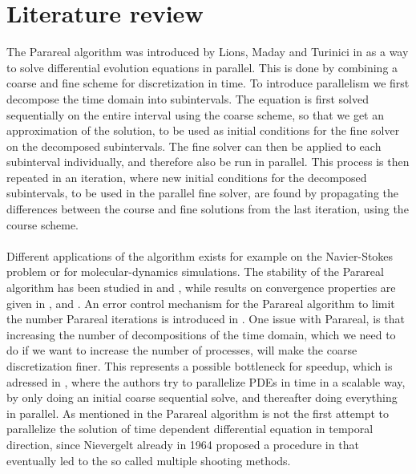 \chapter{Literature review}
The Parareal algorithm was introduced by Lions, Maday and Turinici in \cite{lions2001resolution} as a way to solve differential evolution equations in parallel. This is done by combining a coarse and fine scheme for discretization in time. To introduce parallelism we first decompose the time domain into subintervals. The equation is first solved sequentially on the entire interval using the coarse scheme, so that we get an approximation of the solution, to be used as initial conditions for the fine solver on the decomposed subintervals. The fine solver can then be applied to each subinterval individually, and therefore also be run in parallel. This process is then repeated in an iteration, where new initial conditions for the decomposed subintervals, to be used in the parallel fine solver, are found by propagating the differences between the course and fine solutions from the last iteration, using the course scheme. 
\\
\\
Different applications of the algorithm exists for example on the Navier-Stokes problem\cite{fischer2005parareal} or for molecular-dynamics simulations\cite{baffico2002parallel}. The stability of the Parareal algorithm has been studied in \cite{staff2005stability} and \cite{bal2005convergence}, while results on convergence properties are given in \cite{lions2001resolution},\cite{bal2005convergence} and \cite{gander2007superlinear}. An error control mechanism for the Parareal algorithm to limit the number Parareal iterations is introduced in \cite{lepsa2010efficient}. One issue with Parareal, is that increasing the number of decompositions of the time domain, which we need to do if we want to increase the number of processes, will make the coarse discretization finer. This represents a possible bottleneck for speedup, which is adressed in \cite{rao2014adjoint}, where the authors try to parallelize PDEs in time in a scalable way, by only doing an initial coarse sequential solve, and thereafter doing everything in parallel. As mentioned in \cite{gander2007superlinear} the Parareal algorithm is not the first attempt to parallelize the solution of time dependent differential equation in temporal direction, since Nievergelt already in 1964 proposed a procedure in \cite{nievergelt1964parallel} that eventually led to the so called multiple shooting methods.
\\
